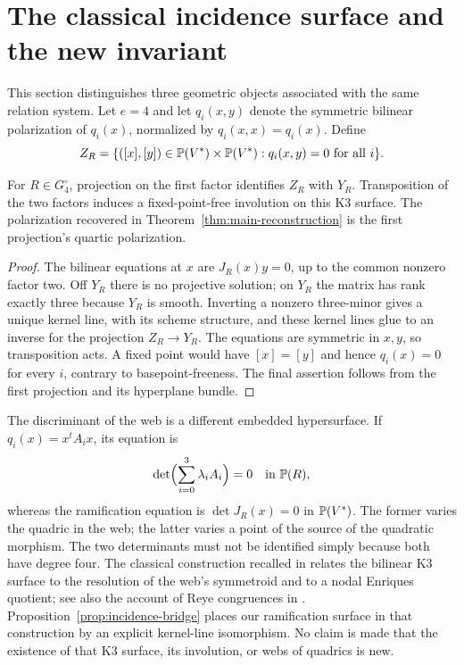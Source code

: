 \section{The classical incidence surface and the new invariant}
\label{sec:classical}
This section distinguishes three geometric objects associated with the
same relation system. Let $e=4$ and let $q_i(x,y)$ denote the symmetric
bilinear polarization of $q_i(x)$, normalized by $q_i(x,x)=q_i(x)$.
Define
\begin{equation}\label{eq:bilinear-incidence}
 Z_R=\{([x],[y])\in\mathbb P(V^*)\times\mathbb P(V^*):q_i(x,y)=0\text{ for all }i\}.
\end{equation}

\begin{proposition}\label{prop:incidence-bridge}
For $R\in G_4^\circ$, projection on the first factor identifies
$Z_R$ with $Y_R$. Transposition of the two factors induces a fixed-point-free
involution on this K3 surface. The polarization recovered in
Theorem~\ref{thm:main-reconstruction} is the first projection's quartic
polarization.
\end{proposition}
\begin{proof}
The bilinear equations at $x$ are $J_R(x)y=0$, up to the common
nonzero factor two. Off $Y_R$ there is no projective solution; on
$Y_R$ the matrix has rank exactly three because $Y_R$ is smooth.
Inverting a nonzero three-minor gives a unique kernel line, with its
scheme structure, and these kernel lines glue to an inverse for the
projection $Z_R\to Y_R$. The equations are symmetric in $x,y$,
so transposition acts. A fixed point would have $[x]=[y]$ and hence
$q_i(x)=0$ for every $i$, contrary to basepoint-freeness. The final
assertion follows from the first projection and its hyperplane bundle.
\end{proof}

The discriminant of the web is a different embedded hypersurface. If
$q_i(x)=x^tA_i x$, its equation is
\begin{equation}\label{eq:discriminant-distinction}
 \det\Bigl(\sum_{i=0}^3\lambda_i A_i\Bigr)=0
       \quad\text{in }\mathbb P(R),
\end{equation}
whereas the ramification equation is $\det J_R(x)=0$ in
$\mathbb P(V^*)$. The former varies the quadric in the web; the latter
varies a point of the source of the quadratic morphism. The two
determinants must not be identified simply because both have degree
four. The classical construction recalled in \cite[\S4]{IK} relates
the bilinear K3 surface to the resolution of the web's symmetroid and
to a nodal Enriques quotient; see also the account of Reye congruences
in \cite{DK}. Proposition~\ref{prop:incidence-bridge} places our
ramification surface in that construction by an explicit kernel-line
isomorphism. No claim is made that the existence of that K3 surface,
its involution, or webs of quadrics is new.

